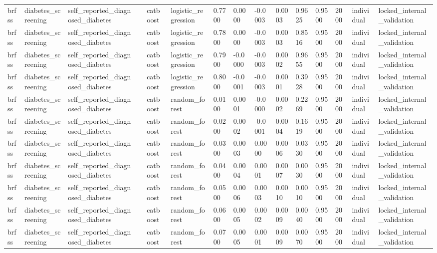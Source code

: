 \begin{tabular}{lllllllllllllll}
brfss & diabetes\_screening & self\_reported\_diagnosed\_diabetes &  & catboost & logistic\_regression & 0.7700 & 0.0000 & -0.0003 & 0.0003 & 0.9625 & 0.9500 & 2000 & individual & locked\_internal\_validation \\
brfss & diabetes\_screening & self\_reported\_diagnosed\_diabetes &  & catboost & logistic\_regression & 0.7800 & 0.0000 & -0.0003 & 0.0003 & 0.8516 & 0.9500 & 2000 & individual & locked\_internal\_validation \\
brfss & diabetes\_screening & self\_reported\_diagnosed\_diabetes &  & catboost & logistic\_regression & 0.7900 & -0.0000 & -0.0003 & 0.0002 & 0.9655 & 0.9500 & 2000 & individual & locked\_internal\_validation \\
brfss & diabetes\_screening & self\_reported\_diagnosed\_diabetes &  & catboost & logistic\_regression & 0.8000 & -0.0001 & -0.0003 & 0.0001 & 0.3928 & 0.9500 & 2000 & individual & locked\_internal\_validation \\
brfss & diabetes\_screening & self\_reported\_diagnosed\_diabetes &  & catboost & random\_forest & 0.0100 & 0.0001 & -0.0000 & 0.0002 & 0.2269 & 0.9500 & 2000 & individual & locked\_internal\_validation \\
brfss & diabetes\_screening & self\_reported\_diagnosed\_diabetes &  & catboost & random\_forest & 0.0200 & 0.0002 & -0.0001 & 0.0004 & 0.1619 & 0.9500 & 2000 & individual & locked\_internal\_validation \\
brfss & diabetes\_screening & self\_reported\_diagnosed\_diabetes &  & catboost & random\_forest & 0.0300 & 0.0003 & 0.0000 & 0.0006 & 0.0330 & 0.9500 & 2000 & individual & locked\_internal\_validation \\
brfss & diabetes\_screening & self\_reported\_diagnosed\_diabetes &  & catboost & random\_forest & 0.0400 & 0.0004 & 0.0001 & 0.0007 & 0.0030 & 0.9500 & 2000 & individual & locked\_internal\_validation \\
brfss & diabetes\_screening & self\_reported\_diagnosed\_diabetes &  & catboost & random\_forest & 0.0500 & 0.0006 & 0.0003 & 0.0010 & 0.0010 & 0.9500 & 2000 & individual & locked\_internal\_validation \\
brfss & diabetes\_screening & self\_reported\_diagnosed\_diabetes &  & catboost & random\_forest & 0.0600 & 0.0005 & 0.0002 & 0.0009 & 0.0040 & 0.9500 & 2000 & individual & locked\_internal\_validation \\
brfss & diabetes\_screening & self\_reported\_diagnosed\_diabetes &  & catboost & random\_forest & 0.0700 & 0.0005 & 0.0001 & 0.0009 & 0.0070 & 0.9500 & 2000 & individual & locked\_internal\_validation \\

\end{tabular}
